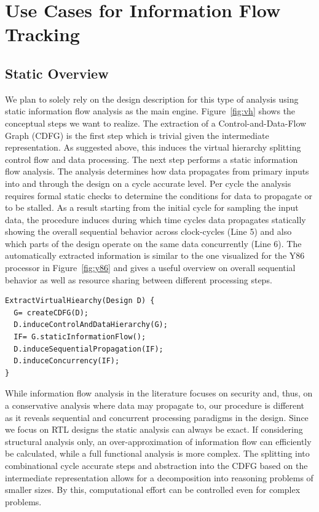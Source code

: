 \section{Use Cases for Information Flow Tracking}


\subsection{Static Overview }

We plan to solely rely on the design description for this type of analysis using static information flow analysis as the main engine. Figure~\ref{fig:vh} shows the conceptual steps we want to realize. 
The extraction of a Control-and-Data-Flow Graph (CDFG) is the first step which is trivial given the intermediate representation. As suggested above, this induces the virtual hierarchy splitting control flow and data processing.
The next step performs a static information flow analysis. The analysis determines how data propagates from primary inputs into and through the design on a cycle accurate level. Per cycle the analysis requires formal static checks to determine the conditions for data to propagate or to be stalled. As a result starting from the initial cycle for sampling the input data, the procedure induces during which time cycles data propagates statically showing the overall sequential behavior across clock-cycles (Line 5) and also which parts of the design operate on the same data concurrently (Line 6). 
The automatically extracted information is similar to the one visualized for the Y86 processor in Figure~\ref{fig:y86} and gives a useful overview on overall sequential behavior as well as resource sharing between different processing steps.

\begin{verbatim}
ExtractVirtualHiearchy(Design D) {
  G= createCDFG(D);
  D.induceControlAndDataHierarchy(G);
  IF= G.staticInformationFlow();
  D.induceSequentialPropagation(IF);
  D.induceConcurrency(IF);
}
\end{verbatim}

While information flow analysis in the literature focuses on security and, thus, on a conservative analysis where data may propagate to, our procedure is different as it reveals sequential and concurrent processing paradigms in the design. Since we focus on RTL designs the static analysis can always be exact. If considering structural analysis only, an over-approximation of information flow can efficiently be calculated, while a full functional analysis is more complex. The splitting into combinational cycle accurate steps and abstraction into the CDFG based on the intermediate representation allows for a decomposition into reasoning problems of smaller sizes. By this, computational effort can be controlled even for complex problems.


